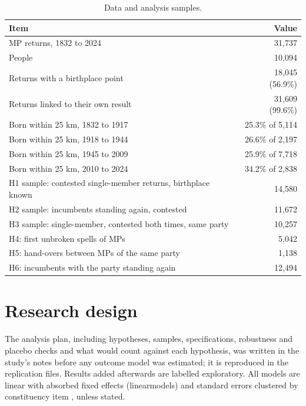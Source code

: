 \documentclass[11pt,a4paper]{article}
\begin{document}
\begin{table}[tbp]\centering\small\caption{Data and analysis samples.}\label{tab:desc}
\begin{tabular}{p{10cm}r}\toprule Item & Value\\\midrule
MP returns, 1832 to 2024 & 31,737\\
People & 10,094\\
Returns with a birthplace point & 18,045 (56.9\%)\\
Returns linked to their own result & 31,609 (99.6\%)\\
\midrule
Born within 25 km, 1832 to 1917 & 25.3\% of 5,114\\
Born within 25 km, 1918 to 1944 & 26.6\% of 2,197\\
Born within 25 km, 1945 to 2009 & 25.9\% of 7,718\\
Born within 25 km, 2010 to 2024 & 34.2\% of 2,838\\
\midrule
H1 sample: contested single-member returns, birthplace known & 14,580\\
H2 sample: incumbents standing again, contested & 11,672\\
H3 sample: single-member, contested both times, same party & 10,257\\
H4: first unbroken spells of MPs & 5,042\\
H5: hand-overs between MPs of the same party & 1,138\\
H6: incumbents with the party standing again & 12,494\\
\bottomrule\end{tabular}\end{table}

\section{Research design}
The analysis plan, including hypotheses, samples, specifications, robustness and placebo checks and what would count against each hypothesis, was written in the study's notes before any outcome model was estimated; it is reproduced in the replication files. Results added afterwards are labelled exploratory. All models are linear with absorbed fixed effects (linearmodels) and standard errors clustered by constituency item \citep{cameronmiller2015}, unless stated.
\end{document}
